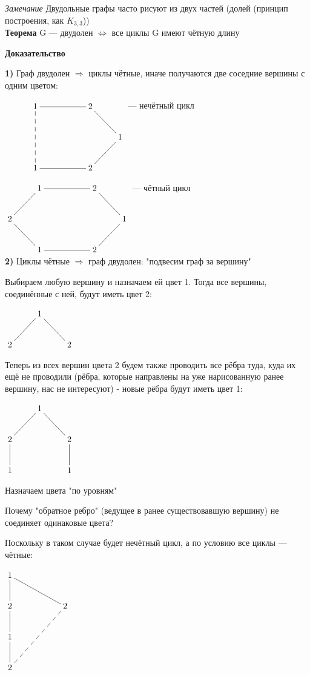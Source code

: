 \documentclass[a4paper, 12pt] {article}
\begin{document}
\textit{Замечание} Двудольные графы часто рисуют из двух частей (долей (принцип построения, как $ K_{3,3}$))\\

\textbf{Теорема} G --- двудолен $ \Leftrightarrow $ все циклы G имеют чётную длину

\textbf{Доказательство}

\textbf{1)} Граф двудолен $ \Rightarrow $ циклы чётные, иначе получаются две соседние вершины с одним цветом:

$\xymatrix{
& 1 \ar@{-}[rr] & & 2 \ar@{-}[rd]\\
& & & & 1 \ar@{-}[ld]\\
& 1 \ar@{-}[rr] \ar@{--}[uu] & & 2 \\
}$ --- нечётный цикл

$\xymatrix{
	& 1 \ar@{-}[rr] & & 2 \ar@{-}[rd]\\
	2 \ar@{-}[ru] & & & & 1 \ar@{-}[ld]\\
	& 1 \ar@{-}[rr] \ar@{-}[lu] & & 2 \\
}$ --- чётный цикл\\

\textbf{2)} Циклы чётные $ \Rightarrow $ граф двудолен: "подвесим граф за вершину"

Выбираем любую вершину и назначаем ей цвет 1. Тогда все вершины, соединённые с ней, будут иметь цвет 2:

$\xymatrix{
	& 1 \ar@{-}[rd] \ar@{-}[ld]& \\
	2  &  & 2\\
}$

Теперь из всех вершин цвета 2 будем также проводить все рёбра туда, куда их ещё не проводили (рёбра, которые направлены на уже нарисованную ранее вершину, нас не интересуют) - новые рёбра будут иметь цвет 1:

$\xymatrix{
	& 1 \ar@{-}[rd] \ar@{-}[ld]& \\
	2  \ar@{-}[d] &  & 2\ar@{-}[d]\\
	1  &  & 1\\
}$

Назначаем цвета "по уровням"

Почему "обратное ребро" (ведущее в ранее существовавшую вершину) не соединяет одинаковые цвета?

Поскольку в таком случае будет нечётный цикл, а по условию все циклы --- чётные:

$\xymatrix{
	1 \ar@{-}[d] \ar@{-}[rrd]  \\
	2 \ar@{-}[d] & & 2 \ar@{--}[ddll] \\
	1 \ar@{-}[d]\\
	2 \\
}$
\end{document}

